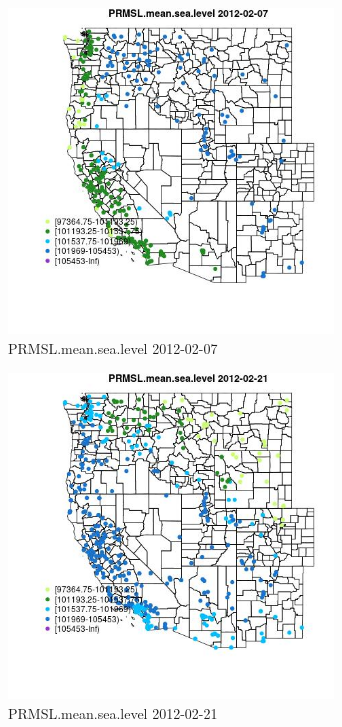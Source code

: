 \begin{figure} 
\centering  
\includegraphics[width=0.77\textwidth]{Code_Outputs/Report_ML_input_PM25_Step4_part_f_de_duplicated_aves_prioritize_24hr_obswNAs_MapObsPRMSLmeansealevel2012-02-07.jpg} 
\caption{\label{fig:Report_ML_input_PM25_Step4_part_f_de_duplicated_aves_prioritize_24hr_obswNAsMapObsPRMSLmeansealevel2012-02-07}PRMSL.mean.sea.level 2012-02-07} 
\end{figure} 
 

\begin{figure} 
\centering  
\includegraphics[width=0.77\textwidth]{Code_Outputs/Report_ML_input_PM25_Step4_part_f_de_duplicated_aves_prioritize_24hr_obswNAs_MapObsPRMSLmeansealevel2012-02-21.jpg} 
\caption{\label{fig:Report_ML_input_PM25_Step4_part_f_de_duplicated_aves_prioritize_24hr_obswNAsMapObsPRMSLmeansealevel2012-02-21}PRMSL.mean.sea.level 2012-02-21} 
\end{figure} 
 

